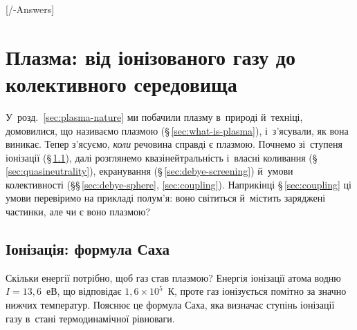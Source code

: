 

\graphicspath{{\currfilebase/Pictures}}

[\currfilebase/\currfilebase-Answers]
\chapter{Плазма: від іонізованого газу до колективного середовища}\label{sec:plasma-basics}\hypertarget{plasma-basics}{}
\hypertarget{PlasmaPhysics}{}

У~розд.~\ref{sec:plasma-nature} ми побачили плазму в~природі й~техніці, домовилися, що називаємо плазмою (§\,\ref{sec:what-is-plasma}), і~з'ясували, як вона виникає.
Тепер з'ясуємо, \emph{коли} речовина справді є плазмою. Почнемо зі~ступеня іонізації (§\,\ref{sec:saha}), далі розглянемо квазінейтральність і~власні коливання
(§\,\ref{sec:quasineutrality}), екранування (§\,\ref{sec:debye-screening}) й~умови колективності (§§\,\ref{sec:debye-sphere}, \ref{sec:coupling}). Наприкінці §\,\ref{sec:coupling} ці умови перевіримо
на прикладі полум'я: воно світиться й~містить заряджені частинки, але чи є воно плазмою?

\section{Іонізація: формула Саха}\label{sec:saha}


Скільки енергії потрібно, щоб газ став плазмою? Енергія іонізації атома водню
$I=13{,}6$~еВ, що відповідає $1{,}6\times10^{5}$~К, проте газ іонізується помітно за
значно нижчих температур. Пояснює це формула Саха, яка визначає ступінь іонізації газу
в~стані термодинамічної рівноваги.

